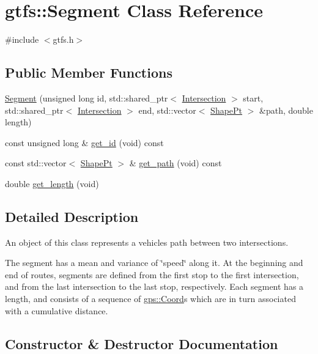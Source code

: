 \hypertarget{classgtfs_1_1Segment}{}\section{gtfs\+:\+:Segment Class Reference}
\label{classgtfs_1_1Segment}


{\ttfamily \#include $<$gtfs.\+h$>$}

\subsection*{Public Member Functions}
\begin{DoxyCompactItemize}
\item 
\hyperlink{classgtfs_1_1Segment_ac1457d5864e30d591eede10e92f6fd85}{Segment} (unsigned long id, std\+::shared\+\_\+ptr$<$ \hyperlink{classgtfs_1_1Intersection}{Intersection} $>$ start, std\+::shared\+\_\+ptr$<$ \hyperlink{classgtfs_1_1Intersection}{Intersection} $>$ end, std\+::vector$<$ \hyperlink{structgtfs_1_1ShapePt}{Shape\+Pt} $>$ \&path, double length)
\item 
const unsigned long \& \hyperlink{classgtfs_1_1Segment_a5c324888b7535df4623d8f32d907fca3}{get\+\_\+id} (void) const
\item 
const std\+::vector$<$ \hyperlink{structgtfs_1_1ShapePt}{Shape\+Pt} $>$ \& \hyperlink{classgtfs_1_1Segment_a9ba2506020d090ccfcd0623b58101a3b}{get\+\_\+path} (void) const
\item 
double \hyperlink{classgtfs_1_1Segment_a4f42ea597e18e54c9ec506697eb333a9}{get\+\_\+length} (void)
\end{DoxyCompactItemize}


\subsection{Detailed Description}
An object of this class represents a vehicles path between two intersections.

The segment has a mean and variance of \char`\"{}speed\char`\"{} along it. At the beginning and end of routes, segments are defined from the first stop to the first intersection, and from the last intersection to the last stop, respectively. Each segment has a length, and consists of a sequence of \hyperlink{classgps_1_1Coord}{gps\+::\+Coord}\textquotesingle{}s which are in turn associated with a cumulative distance. 

\subsection{Constructor \& Destructor Documentation}
\mbox{\label{classgtfs_1_1Segment_ac1457d5864e30d591eede10e92f6fd85}} 
